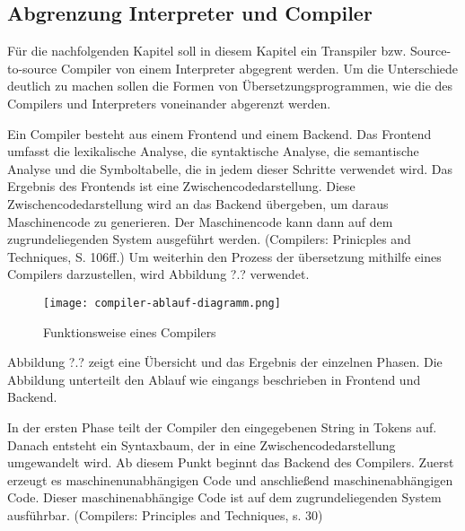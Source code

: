 %
	
 
    \pagebreak

\subsection{Abgrenzung Interpreter und Compiler}
Für die nachfolgenden Kapitel soll in diesem Kapitel ein Transpiler bzw. Source-to-source Compiler von einem Interpreter abgegrent werden. Um die Unterschiede deutlich zu machen sollen die Formen von Übersetzungsprogrammen, wie die des Compilers und Interpreters voneinander abgerenzt werden. 
  
Ein Compiler besteht aus einem Frontend und einem Backend. Das Frontend umfasst die lexikalische Analyse, die syntaktische Analyse, die semantische Analyse und die Symboltabelle, die in jedem dieser Schritte verwendet wird. 
Das Ergebnis des Frontends ist eine Zwischencodedarstellung. Diese Zwischencodedarstellung wird an das Backend übergeben, um daraus Maschinencode zu generieren. Der Maschinencode kann dann auf dem zugrundeliegenden System ausgeführt werden. (Compilers: Prinicples and Techniques, S. 106ff.)
Um weiterhin den Prozess der übersetzung mithilfe eines Compilers darzustellen, wird Abbildung ?.? verwendet.

\pagebreak
\begin{figure}[h]
  \centering
  \caption{Funktionsweise eines Compilers}
  \texttt{[image: compiler-ablauf-diagramm.png]}
  \label{fig:compiler}
\end{figure}
\pagebreak
Abbildung ?.? zeigt eine Übersicht und das Ergebnis der einzelnen Phasen. Die Abbildung unterteilt den Ablauf wie eingangs beschrieben in Frontend und Backend.

In der ersten Phase teilt der Compiler den eingegebenen String in Tokens auf. Danach entsteht ein Syntaxbaum, der in eine Zwischencodedarstellung umgewandelt wird. Ab diesem Punkt beginnt das Backend des Compilers. Zuerst erzeugt es maschinenunabhängigen Code und anschließend maschinenabhängigen Code. Dieser maschinenabhängige Code ist auf dem zugrundeliegenden System ausführbar. (Compilers: Principles and Techniques, s. 30) 

